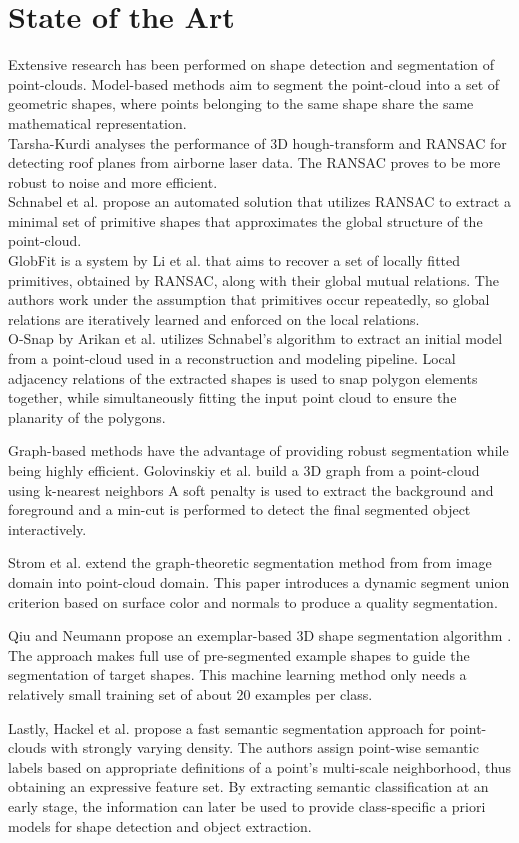 \section{State of the Art}
Extensive research has been performed on shape detection and segmentation of point-clouds. Model-based methods aim to segment the point-cloud into a set of geometric shapes, where points belonging to the same shape share the same mathematical representation. 
\\
Tarsha-Kurdi\cite{tarsha2007hough} analyses the performance of 3D hough-transform and RANSAC for detecting roof planes from airborne laser data. The RANSAC proves to be more robust to noise and more efficient.
\\
Schnabel et al. \cite{schnabel-2007-efficient} propose an automated solution that utilizes RANSAC to extract a minimal set of primitive shapes that approximates the global structure of the point-cloud.  
\\
GlobFit is a system by Li et al. \cite{li2011globfit} that aims to recover a set of locally fitted primitives, obtained by RANSAC, along with their global mutual relations. The authors work under the assumption that primitives occur repeatedly, so global relations are iteratively learned and enforced on the local relations. 
\\
O-Snap by Arikan et al. \cite{arikan-2013-osn} utilizes Schnabel's algorithm to extract an initial model from a point-cloud used in a reconstruction and modeling pipeline. Local adjacency relations of the extracted shapes is used to snap polygon elements together, while simultaneously fitting the input point cloud to ensure the planarity of the polygons. 

Graph-based methods have the advantage of providing robust segmentation while being highly efficient. Golovinskiy et al. \cite{golovinskiy2009min} build a 3D graph from a point-cloud using k-nearest neighbors A soft penalty is used to extract the background and foreground and a min-cut is performed to detect the final segmented object interactively. 

Strom et al. \cite{strom2010graph} extend the graph-theoretic segmentation method from \cite{felzenszwalb2004efficient} from image domain into point-cloud domain. This paper introduces a dynamic segment union criterion based on surface color and normals to produce a quality segmentation. 

Qiu and Neumann propose an exemplar-based 3D shape segmentation algorithm  \cite{qiu2016exemplar}. The approach makes full use of pre-segmented example shapes to guide the segmentation of target shapes. This machine learning method only needs a relatively small training set of about 20 examples per class.  

Lastly, Hackel et al. \cite{hackel2016fast} propose a fast semantic segmentation approach for point-clouds with strongly varying density. The authors assign point-wise semantic labels based on appropriate definitions of a point's multi-scale neighborhood, thus obtaining an expressive feature set. 
By extracting semantic classification at an early stage, the information can later be used to provide class-specific a priori models for shape detection and object extraction. 


